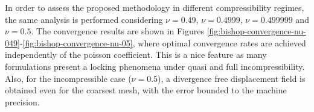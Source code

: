 \documentclass[english,11pt,3p,number,sort&compress]{elsarticle}
\begin{document}
In order to assess the proposed methodology in different compressibility regimes, the same analysis is performed considering $\nu=0.49$, $\nu=0.4999$, $\nu=0.499999$ and $\nu=0.5$. The convergence results are shown in Figures \ref{fig:bishop-convergence-nu-049}-\ref{fig:bishop-convergence-nu-05}, where optimal convergence rates are achieved independently of the poisson coefficient. This is a nice feature as many formulations present a locking phenomena under quasi and full incompressibility. Also, for the incompressible case ($\nu=0.5$), a divergence free displacement field is obtained even for the coarsest mesh, with the error bounded to the machine precision.

\end{document}

